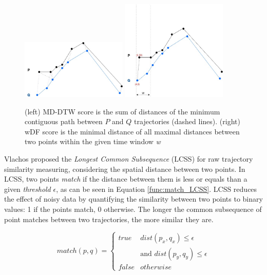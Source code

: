 \begin{figure}[h]
\centering
\includegraphics[width=0.45\textwidth]{Related_Works/related_trajes-DTW.jpg}
\includegraphics[width=0.45\textwidth]{Related_Works/related_trajes-wDF.jpg}
\caption{\label{fig:related_trajes_wDF_DTW}(left) {MD-DTW score is the sum of distances of the minimum contiguous path between $P$ and $Q$ trajectories (dashed lines)}. (right) wDF score is the minimal distance of all maximal distances between two points within the given time window \textit{w}}
\end{figure}

Vlachos \cite{vlachos2002discovering} proposed the \emph{Longest Common Subsequence} (LCSS) for raw trajectory similarity measuring, considering the spatial distance between two points. In {LCSS}, two points \textit{match} if the distance between them is less or equals than a given \textit{threshold} $\epsilon$, as can be seen in Equation \ref{func:match_LCSS}. LCSS reduces the effect of noisy data by quantifying the similarity between two points to binary values: 1 if the points match, 0 otherwise. The longer the common subsequence of point matches between two trajectories, the more similar they are. 

\begin{equation}
\label{func:match_LCSS}
  match(p, q) = 
  \begin{cases} 
      true & dist(p_x, q_x)  \leq \epsilon\\ 
        &            \text{and } dist(p_y, q_y)  \leq \epsilon\\
      false & otherwise
  \end{cases}
\end{equation}

